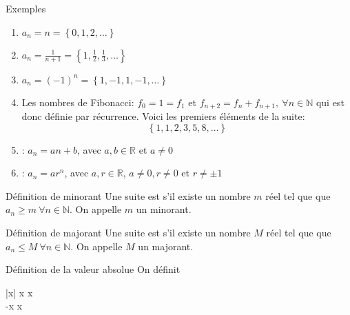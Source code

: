 \documentclass[a4paper]{article}
\begin{document}
\begin{parag}{Exemples}
    \begin{enumerate}[left=0pt]
        \item $a_n = n = \left\{0, 1, 2, \ldots\right\}$
        \item $a_n = \frac{1}{n+1} = \left\{1, \frac{1}{2}, \frac{1}{3}, \ldots\right\}$
        \item $a_n = \left(-1\right)^n = \left\{1, -1, 1, -1, \ldots\right\}$
        \item Les nombres de Fibonacci: $f_0 = 1 = f_1$ et $f_{n+2} = f_n + f_{n+1},\ \forall n \in \mathbb{N}$ qui est donc définie par récurrence. Voici les premiers éléments de la suite: 
        \[\left\{1, 1, 2, 3, 5, 8, \ldots\right\}\]
        

    \item {}: $a_n = an + b$, avec $a, b \in \mathbb{R}$ et $a \neq 0$
    \item {}: $a_n = ar^n$, avec $a, r \in \mathbb{R}$, $a \neq 0, r\neq 0$ et $r\neq \pm 1$
    \end{enumerate}
\end{parag}

\begin{parag}{Définition de minorant}
    Une suite est  s'il existe un nombre $m$ réel tel que que $a_n \geq m \ \forall n \in \mathbb{N}$. On appelle $m$ un minorant.
\end{parag}

\begin{parag}{Définition de majorant}
    Une suite est  s'il existe un nombre $M$ réel tel que que $a_n \leq M \ \forall n \in \mathbb{N}$. On appelle $M$ un majorant.
\end{parag}

\begin{parag}{Définition de la valeur absolue}
    On définit
    \begin{functionbypart}{\left|x\right|}
    x x  \\
    -x x 
    \end{functionbypart}
\end{parag}
\end{document}
